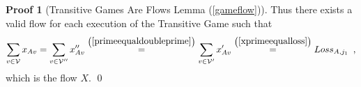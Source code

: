 \documentclass[11pt]{llncs}
\theoremstyle{definition}
\newtheorem{sepproof}{Proof}
\begin{document}
\begin{sepproof}[Transitive Games Are Flows Lemma (\ref{gameflow})]
       Thus there exists a valid flow for each execution of the Transitive Game such that
       \begin{equation}
          \sum\limits_{v \in \mathcal{V}}x_{Av} = \sum\limits_{v \in \mathcal{V}''}x''_{Av}
          \overset{\left(\ref{primeequaldoubleprime}\right)}{=} \sum\limits_{v \in \mathcal{V}'}x'_{Av}
          \overset{\left(\ref{xprimeequalloss}\right)}{=} Loss_{A, j_1} \enspace,
       \end{equation}
       which is the flow $X$. \qed
    \end{sepproof}
\end{document}
